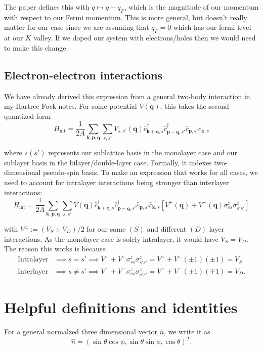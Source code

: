 \documentclass[12pt]{revtex4-2}
\begin{document}
The paper defines this with $q \mapsto q - q_F$, which is the magnitude of our momentum with respect to our Fermi momentum.  This is more general, but doesn't really matter for our case since we are assuming that $q_F = 0$ which has our fermi level at our $K$ valley.  If we doped our system with electrons/holes then we would need to make this change.

\subsection{Electron-electron interactions}
We have already derived this expression from a general two-body interaction in my Hartree-Fock notes.  For some potential $V(\mathbf{q})$, this takes the second-quantized form
\begin{equation}
    H_\text{int} = \frac{1}{2A} \sum_{\mathbf{k},\mathbf{p},\mathbf{q}} \sum_{s,s'} V_{s,s'}(\mathbf{q}) \hat{c}_{\mathbf{k}+\mathbf{q},s}^\dagger \hat{c}_{\mathbf{p}-\mathbf{q},s'}^\dagger \hat{c}_{\mathbf{p},s'} \hat{c}_{\mathbf{k},s}
\end{equation}

where $s(s')$ represents our sublattice basis in the monolayer case and our sublayer basis in the bilayer/double-layer case.  Formally, it indexes two-dimensional pseudo-spin basis.  To make an expression that works for all cases, we need to account for intralayer interactions being stronger than interlayer interactions:
\begin{equation}
    \boxed{ H_\text{int} = \frac{1}{2A} \sum_{\mathbf{k},\mathbf{p},\mathbf{q}} \sum_{s,s'} V(\mathbf{q}) \hat{c}_{\mathbf{k}+\mathbf{q},s}^\dagger \hat{c}_{\mathbf{p}-\mathbf{q},s'}^\dagger \hat{c}_{\mathbf{p},s'} \hat{c}_{\mathbf{k},s} \left[ V^+(\mathbf{q}) + V^-(\mathbf{q})\sigma^z_{ss} \sigma^z_{s's'} \right] }
\end{equation}

with $V^\pm := (V_S \pm V_D)/2$ for our same $(S)$ and different $(D)$ layer interactions.  As the monolayer case is solely intralayer, it would have $V_S = V_D$. The reason this works is because
\begin{align}
    \text{Intralayer} &\implies s=s' \implies  V^+ + V^-\sigma^z_{ss} \sigma^z_{s's'} = V^+ + V^-(\pm1)(\pm1) = V_S \\
    \text{Interlayer} &\implies s \neq s' \implies  V^+ + V^-\sigma^z_{ss} \sigma^z_{s's'} = V^+ + V^-(\pm1)(\mp1) = V_D.
\end{align}

\newpage
\section{Helpful definitions and identities}
For a general normalzed three dimensional vector $\hat{n}$, we write it as
\begin{equation}
    \hat{n} = (\sin\theta\cos\phi , \sin\theta\sin\phi , \cos\theta)^T.
\end{equation}  
\end{document}
